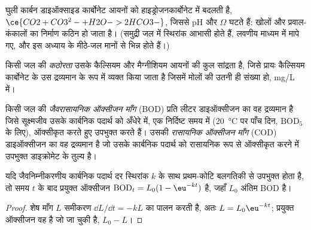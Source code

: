 घुली कार्बन डाइऑक्साइड कार्बोनेट आयनों को हाइड्रोजनकार्बोनेट में बदलती है, $\ce{CO2 + CO3^2- + H2O -> 2HCO3-}$,
जिससे pH और $\Omega$ घटते हैं: खोलों और प्रवाल-कंकालों का निर्माण कठिन हो जाता है। (समुद्री
जल में स्थिरांक आभासी होते हैं, लवणीय माध्यम में मापे गए, और
इस अध्याय के मीठे-जल मानों से भिन्न होते हैं।)

\begin{definition}[जल की कठोरता]\label{def:b3:environmental-toxicology:hardness}
किसी जल की \emph{कठोरता} उसके कैल्सियम और मैग्नीशियम आयनों की
कुल सांद्रता है, जिसे प्रायः कैल्सियम कार्बोनेट के उस द्रव्यमान के रूप में व्यक्त किया जाता है
जिसमें मोलों की उतनी ही संख्या हो, mg/L में।
\end{definition}

\begin{definition}[ऑक्सीजन माँग]\label{def:b3:environmental-toxicology:oxygen-demand}
किसी जल की \emph{जैवरासायनिक ऑक्सीजन माँग} (BOD)
प्रति लीटर डाइऑक्सीजन का वह द्रव्यमान है जिसे सूक्ष्मजीव उसके
कार्बनिक पदार्थ को अँधेरे में, एक निर्दिष्ट समय में (\qty{20}{\celsius} पर पाँच दिन, $\mathrm{BOD_5}$ के लिए), ऑक्सीकृत करते हुए उपभुक्त करते हैं। उसकी
\emph{रासायनिक ऑक्सीजन माँग} (COD) डाइऑक्सीजन का वह
द्रव्यमान है जो उसके कार्बनिक पदार्थ को रासायनिक रूप से ऑक्सीकृत करने में उपभुक्त
डाइक्रोमेट के तुल्य है।
\end{definition}

\begin{proposition}[BOD वक्र]\label{prop:b3:environmental-toxicology:bod}
यदि जैवनिम्नीकरणीय कार्बनिक पदार्थ दर
स्थिरांक $k$ के साथ प्रथम-कोटि बलगतिकी से उपभुक्त होता है, तो समय $t$ के बाद प्रयुक्त ऑक्सीजन $\mathrm{BOD}_t = L_0(1 - \eu^{-kt})$ है, जहाँ $L_0$ अंतिम BOD है।
\end{proposition}

\begin{proof}
शेष माँग $L$ समीकरण $\dd L/\dd t = -kL$ का पालन करती है, अतः $L = L_0\eu^{-kt}$; प्रयुक्त ऑक्सीजन वह है जो जा चुकी है,
$L_0 - L$।
\end{proof}

